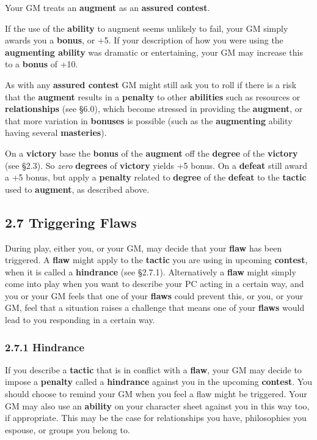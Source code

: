 \documentclass[
  11pt,
]{article}
\begin{document}
Your GM treats an \textbf{augment} as an \textbf{assured contest}.

If the use of the \textbf{ability} to augment seems unlikely to fail,
your GM simply awards you a \textbf{bonus}, or +5. If your description
of how you were using the \textbf{augmenting ability} was dramatic or
entertaining, your GM may increase this to a \textbf{bonus} of +10.

As with any \textbf{assured contest} GM might still ask you to roll if
there is a risk that the \textbf{augment} results in a \textbf{penalty}
to other \textbf{abilities} such as resources or \textbf{relationships}
(see §6.0), which become stressed in providing the \textbf{augment}, or
that more variation in \textbf{bonuses} is possible (such as the
\textbf{augmenting} ability having several \textbf{masteries}).

On a \textbf{victory} base the \textbf{bonus} of the \textbf{augment}
off the \textbf{degree} of the \textbf{victory} (see §2.3). So
\emph{zero} \textbf{degrees} of \textbf{victory} yields +5 bonus. On a
\textbf{defeat} still award a +5 bonus, but apply a \textbf{penalty}
related to \textbf{degree} of the \textbf{defeat} to the \textbf{tactic}
used to \textbf{augment}, as described above.

\hypertarget{triggering-flaws}{%
\subsection{2.7 Triggering Flaws}\label{triggering-flaws}}

During play, either you, or your GM, may decide that your \textbf{flaw}
has been triggered. A \textbf{flaw} might apply to the \textbf{tactic}
you are using in upcoming \textbf{contest}, when it is called a
\textbf{hindrance} (see §2.7.1). Alternatively a \textbf{flaw} might
simply come into play when you want to describe your PC acting in a
certain way, and you or your GM feels that one of your \textbf{flaws}
could prevent this, or you, or your GM, feel that a situation raises a
challenge that means one of your \textbf{flaws} would lead to you
responding in a certain way.

\hypertarget{hindrance}{%
\subsubsection{2.7.1 Hindrance}\label{hindrance}}

If you describe a \textbf{tactic} that is in conflict with a
\textbf{flaw}, your GM may decide to impose a \textbf{penalty} called a
\textbf{hindrance} against you in the upcoming \textbf{contest}. You
should choose to remind your GM when you feel a flaw might be triggered.
Your GM may also use an \textbf{ability} on your character sheet against
you in this way too, if appropriate. This may be the case for
relationships you have, philosophies you espouse, or groups you belong
to.
\end{document}
